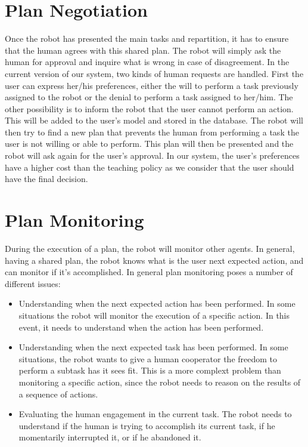 \section{Plan Negotiation}
Once the robot has presented the main tasks and repartition, it has to ensure that the human agrees with this shared plan. The robot will simply ask the human for approval and inquire what is wrong in case of disagreement.
In the current version of our system, two kinds of human requests are handled. First the user can express her/his preferences, either the will to perform a task previously assigned to the robot or the denial to perform a task assigned to her/him. The other possibility is to inform the robot that the user cannot perform an action. This will be added to the user's model and stored in the database. The robot will then try to find a new plan that prevents the human from performing a task the user is not willing or able to perform. This plan will then be presented and the robot will ask again for the user's approval. In our system, the user's preferences have a higher cost than the teaching policy as we consider that the user should have the final decision.



\section{Plan Monitoring}
During the execution of a plan, the robot will monitor other agents. In general, having a shared plan, the robot knows what is the user next expected action, and can monitor if it's accomplished. In general plan monitoring poses a number of different issues:
\begin{itemize}
\item Understanding when the next expected action has been performed. In some situations the robot will monitor the execution of a specific action. In this event, it needs to understand when the action has been performed.
\item Understanding when the next expected task has been performed. In some situations, the robot wants to give a human cooperator the freedom to perform a subtask has it sees fit. This is a more complext problem than monitoring a specific action, since the robot needs to reason on the results of a sequence of actions.
\item Evaluating the human engagement in the current task. The robot needs to understand if the human is trying to accomplish its current task, if he momentarily interrupted it, or if he abandoned it.
\end{itemize}


